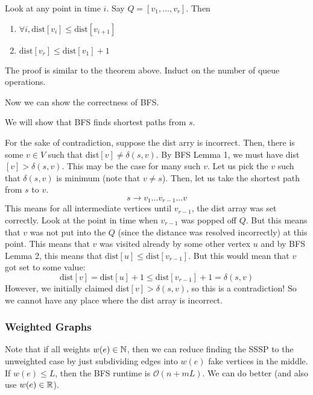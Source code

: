 \begin{theorem} 
    Look at any point in time $i$. Say $Q = [v_1, \dots, v_r]$. Then
    \begin{enumerate}
        \item $\forall i, \text{dist}[v_i] \leq \text{dist}[v_{i + 1}]$
        \item $\text{dist}[v_r] \leq \text{dist}[v_1] + 1$
    \end{enumerate}

    \begin{proof*}
        The proof is similar to the theorem above. Induct on the number of queue operations.
    \end{proof*}
\end{theorem}

Now we can show the correctness of BFS.

\begin{theorem}
    We will show that BFS finds shortest paths from $s$.

    \begin{proof*}
        For the sake of contradiction, suppose the dist arry is incorrect. Then, there is some $v \in V$ such that dist$[v] \neq \delta(s, v)$.
        By BFS Lemma 1, we must have dist$[v] > \delta(s, v)$. This may be the case for many such $v$. Let us pick the $v$ such that
        $\delta(s, v)$ is minimum (note that $v \neq s$). Then, let us take the shortest path from $s$ to $v$.
        \[ s \to v_1 \dots v_{r - 1} \dots v \]
        This means for all intermediate vertices until $v_{r - 1}$, the dist array was set correctly. Look at the point in time when $v_{r - 1}$ was popped
        off $Q$. But this means that $v$ was not put into the $Q$ (since the distance was resolved incorrectly) at this point. This means that $v$ was visited already by some
        other vertex $u$ and by BFS Lemma 2, this means that $\text{dist}[u] \leq \text{dist}[v_{r - 1}]$. But this would mean that $v$ got set to some value:
        \[ \text{dist}[v] = \text{dist}[u] + 1 \leq \text{dist}[v_{r - 1}] + 1 = \delta(s, v) \]
        However, we initially claimed dist$[v] > \delta(s,v)$, so this is a contradiction! So we cannot have any place where the dist array is incorrect.
    \end{proof*}
\end{theorem}


\subsubsection{Weighted Graphs}
Note that if all weights $w(e) \in \operatorname{\mathbb{N}}$, then we can reduce finding the SSSP to the unweighted case by just subdividing edges into $w(e)$ fake vertices in the middle.
If $w(e) \leq L$, then the BFS runtime is $\mathcal{O}(n + mL)$. We can do better (and also use $w(e) \in \operatorname{\mathbb{R}}$).

